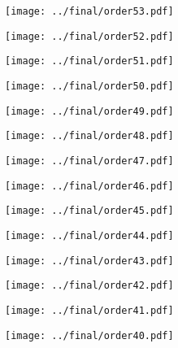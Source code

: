 \documentclass{article}
\begin{document}
\begin{figure}[H]
    \centering
    \texttt{[image: ../final/order53.pdf]}
\end{figure}
\begin{figure}[H]
    \centering
    \texttt{[image: ../final/order52.pdf]}
\end{figure}
\begin{figure}[H]
    \centering
    \texttt{[image: ../final/order51.pdf]}
\end{figure}
\begin{figure}[H]
    \centering
    \texttt{[image: ../final/order50.pdf]}
\end{figure}
\begin{figure}[H]
    \centering
    \texttt{[image: ../final/order49.pdf]}
\end{figure}
\begin{figure}[H]
    \centering
    \texttt{[image: ../final/order48.pdf]}
\end{figure}
\begin{figure}[H]
    \centering
    \texttt{[image: ../final/order47.pdf]}
\end{figure}
\begin{figure}[H]
    \centering
    \texttt{[image: ../final/order46.pdf]}
\end{figure}
\begin{figure}[H]
    \centering
    \texttt{[image: ../final/order45.pdf]}
\end{figure}
\begin{figure}[H]
    \centering
    \texttt{[image: ../final/order44.pdf]}
\end{figure}
\begin{figure}[H]
    \centering
    \texttt{[image: ../final/order43.pdf]}
\end{figure}
\begin{figure}[H]
    \centering
    \texttt{[image: ../final/order42.pdf]}
\end{figure}
\begin{figure}[H]
    \centering
    \texttt{[image: ../final/order41.pdf]}
\end{figure}
\begin{figure}[H]
    \centering
    \texttt{[image: ../final/order40.pdf]}
\end{figure}
\end{document}
